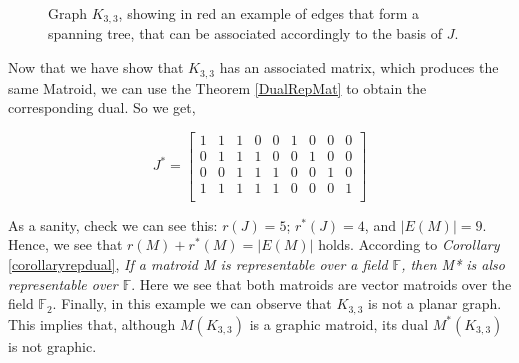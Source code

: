 \begin{exmp}
\begin{figure}[H]
    \centering
    \caption{Graph $K_{3,3}$, showing in red an example of edges that form a spanning tree, that can be associated accordingly to the basis of $J$.}
    \label{K33STE}
\end{figure}

Now that we have show that $K_{3,3}$ has an associated matrix, which produces the same Matroid, we can use the Theorem \ref{DualRepMat} to obtain the corresponding dual. 
So we get, 
\begin{figure}[H]
  $$J^*=\begin{bmatrix} 
1 & 1 & 1 & 0 & 0 & 1 & 0 & 0 & 0\\
0 & 1 & 1 & 1 & 0 & 0 & 1 & 0 & 0\\
0 & 0 & 1 & 1 & 1 & 0 & 0 & 1 & 0\\
1 & 1 & 1 & 1 & 1 & 0 & 0 & 0 & 1\\
\end{bmatrix}$$
\end{figure}

As a sanity, check we can see this: $r(J) = 5$;  $r^*(J)=4$, and $|E(M)|=9$. Hence, we see that $r(M) + r^*(M) = |E(M)|$ holds.
According to \textit{Corollary} \ref{corollaryrepdual}, \textit{If a matroid \textit{M} is \textit{representable} over a field $\mathbb{F}$, then \textit{M*} is also representable over $\mathbb{F}$}. Here we see that both matroids are vector matroids over the field $\mathbb{F}_2$. 
Finally, in this example we can observe that $K_{3,3}$ is not a planar graph. This implies that, although $M(K_{3,3})$ is a graphic matroid, its dual $M^*(K_{3,3})$ is not graphic.

\end{exmp}
